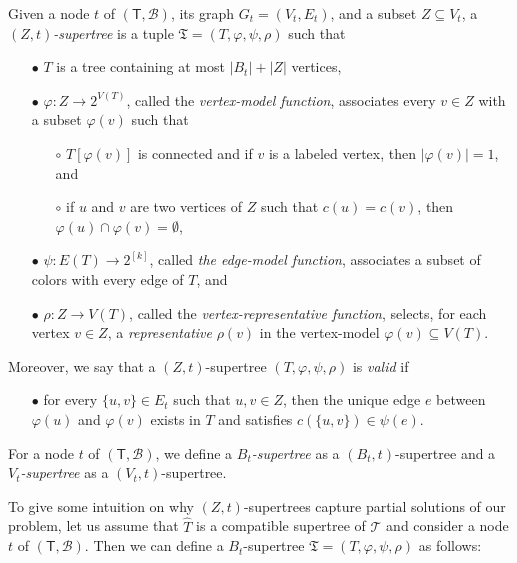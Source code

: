 \begin{definition}\label{def:supertree}
Given a node $t$ of $(\mathsf{T},\mathcal{B})$, its graph $G_t = (V_t,E_t)$, and  a subset $Z\subseteq V_t$, a  \emph{$(Z,t)$-supertree} is a tuple $\mathfrak{T}=(T,\varphi,\psi,\rho)$ such that
\begin{itemize}
\item[$\bullet$] $T$ is a tree containing at most $|B_t|+|Z|$ vertices,
\item[$\bullet$] $\varphi : Z \rightarrow 2^{V(T)}$, called the \emph{vertex-model function}, associates every $v\in Z$ with a subset $\varphi(v)$ such that
\begin{itemize}
\item[$\circ$] $T[\varphi(v)]$ is connected and if $v$ is a labeled vertex, then $|\varphi(v)|=1$, and
\item[$\circ$] if $u$ and $v$ are two vertices of $Z$ such that $c(u)=c(v)$, then $\varphi(u)\cap\varphi(v)=\emptyset$,
\end{itemize}

\item[$\bullet$] $\psi : E(T) \rightarrow 2^{[k]}$, called \emph{the edge-model function}, associates a subset of colors with every edge of $T$, and

\item[$\bullet$] $\rho: Z \to V(T)$, called the \emph{vertex-representative function}, selects, for each vertex $v \in Z$, a \emph{representative} $\rho(v)$ in the vertex-model $\varphi(v) \subseteq V(T)$.
\end{itemize}

\noindent Moreover, we say that a $(Z,t)$-supertree $(T,\varphi,\psi,\rho)$ is \emph{valid} if
\begin{itemize}
\item[$\bullet$] for every $\{u,v\} \in E_t$ such that $u, v \in Z$, then the unique edge $e$ between $\varphi(u)$ and $\varphi(v)$ exists in $T$ and satisfies $c(\{u,v\}) \in \psi(e)$.
\end{itemize}

\noindent For a node $t$ of $(\mathsf{T},\mathcal{B})$, we define a \emph{$B_t$-supertree} as a $(B_t,t)$-supertree and a \emph{$V_t$-supertree} as a $(V_t,t)$-supertree.
\end{definition}




To give some intuition on why $(Z,t)$-supertrees capture partial solutions of our problem, let us assume that $\widehat{T}$ is a compatible supertree of $\mathcal{T}$ and consider a node $t$ of $(\mathsf{T},\mathcal{B})$. Then
we can define a $B_t$-supertree $\mathfrak{T}=(T,\varphi,\psi,\rho)$ as follows:



